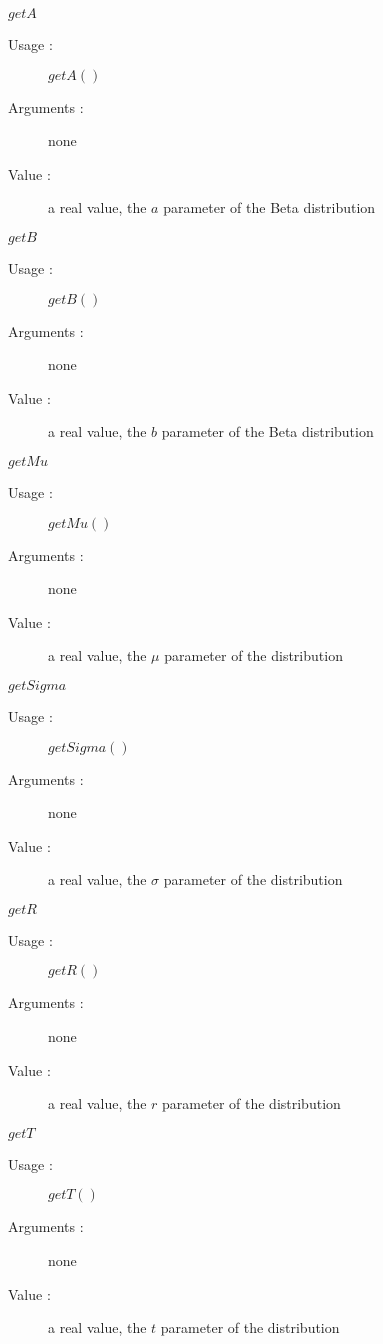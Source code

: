 \begin{description}
\begin{description}
  \item $getA$
    \begin{description}
    \item[Usage :] $getA()$
    \item[Arguments :] none
    \item[Value :]  a real value, the $a$ parameter of the Beta distribution
    \end{description}
    \bigskip
  \item $getB$
    \begin{description}
    \item[Usage :] $getB()$
    \item[Arguments :] none
    \item[Value :]  a real value, the  $b$ parameter of the Beta distribution
    \end{description}
    \bigskip
  \item $getMu$
    \begin{description}
    \item[Usage :] $getMu()$
    \item[Arguments :] none
    \item[Value :]  a real value,  the $\mu$ parameter of the  distribution
    \end{description}
    \bigskip
  \item $getSigma$
    \begin{description}
    \item[Usage :] $getSigma()$
    \item[Arguments :] none
    \item[Value :]  a real value,  the $\sigma$ parameter of the  distribution
    \end{description}
    \bigskip
  \item $getR$
    \begin{description}
    \item[Usage :] $getR()$
    \item[Arguments :] none
    \item[Value :]  a real value,  the $r$ parameter of the  distribution
    \end{description}
    \bigskip
  \item $getT$
    \begin{description}
    \item[Usage :] $getT()$
    \item[Arguments :] none
    \item[Value :]  a real value,  the $t$ parameter of the  distribution
    \end{description}
    \bigskip


\end{description}
\end{description}
